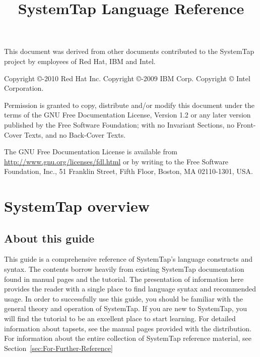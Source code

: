 \documentclass[twoside,english]{article}
\begin{document}
\title{SystemTap Language Reference}

\maketitle
\newpage{}
This document was derived from other documents contributed to the SystemTap project by employees of Red Hat, IBM and Intel.\newline

Copyright \copyright{}-2010 Red Hat Inc.\newline
Copyright \copyright{}-2009 IBM Corp.\newline
Copyright \copyright{} Intel Corporation.\newline

Permission is granted to copy, distribute and/or modify this document
under the terms of the GNU Free Documentation License, Version 1.2
or any later version published by the Free Software Foundation;
with no Invariant Sections, no Front-Cover Texts, and no Back-Cover Texts.\newline

The GNU Free Documentation License is available from
\url{http://www.gnu.org/licenses/fdl.html} or by writing to
the Free Software Foundation, Inc., 51 Franklin Street,
Fifth Floor, Boston, MA 02110-1301, USA.
\newpage{}
\tableofcontents{}
\newpage{}

\section{SystemTap overview\label{sec:SystemTap-Overview}}

\subsection{About this guide}

This guide is a comprehensive reference of SystemTap's language constructs
and syntax. The contents borrow heavily from existing SystemTap documentation
found in manual pages and the tutorial. The presentation of information here
provides the reader with a single place to find language syntax and recommended
usage. In order to successfully use this guide, you should be familiar with
the general theory and operation of SystemTap. If you are new to SystemTap,
you will find the tutorial to be an excellent place to start learning. For
detailed information about tapsets, see the manual pages provided with the
distribution. For information about the entire collection of SystemTap reference
material, see Section~\ref{sec:For-Further-Reference}
\end{document}
